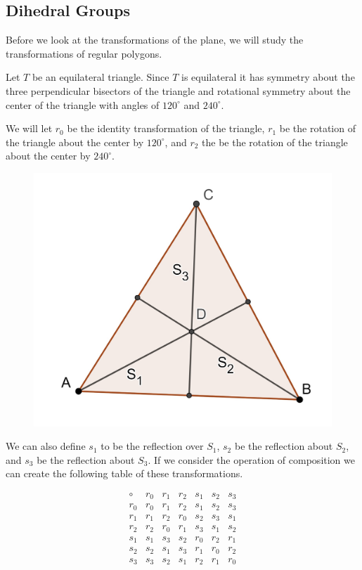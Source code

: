 \documentclass[
]{book}
\theoremstyle{definition}
\theoremstyle{definition}
\theoremstyle{definition}
\theoremstyle{definition}
\theoremstyle{remark}
\begin{document}
\hypertarget{dihedral-groups}{%
\subsection{Dihedral Groups}\label{dihedral-groups}}

Before we look at the transformations of the plane, we will study the transformations of regular polygons.

Let \(T\) be an equilateral triangle. Since \(T\) is equilateral it has symmetry about the three perpendicular bisectors of the triangle and rotational symmetry about the center of the triangle with angles of \(120^\circ\) and \(240^\circ\).

We will let \(r_0\) be the identity transformation of the triangle, \(r_1\) be the rotation of the triangle about the center by \(120^\circ\), and \(r_2\) the be the rotation of the triangle about the center by \(240^\circ\).

\begin{figure}

{\centering \includegraphics[width=0.4\linewidth]{images/D3Group} 

}

\end{figure}

We can also define \(s_1\) to be the reflection over \(S_1\), \(s_2\) be the reflection about \(S_2\), and \(s_3\) be the reflection about \(S_3\). If we consider the operation of composition we can create the following table of these transformations.

\[\begin{array}{c|cccccc}
\circ & r_0 & r_1 & r_2 & s_1 & s_2 & s_3  \\ \hline
r_0  & r_0 & r_1 & r_2 & s_1 & s_2 & s_3 \\
r_1 & r_1 & r_2 & r_0 & s_2 & s_3 & s_1 \\
r_2 & r_2 & r_0 & r_1 & s_3 & s_1 & s_2 \\
s_1 & s_1 & s_3 & s_2 & r_0 & r_2 & r_1 \\
s_2 & s_2 & s_1 & s_3 & r_1 & r_0 & r_2 \\
s_3 & s_3 & s_2 & s_1 & r_2 & r_1 & r_0 \\
\end{array}\]
\end{document}

